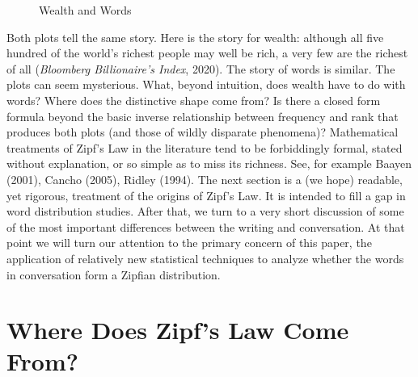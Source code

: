 \documentclass[12pt]{article}
\begin{document}
\begin{figure}[h!]
    \centering
    \hfill
    \caption{Wealth and Words}%
\end{figure}
Both plots tell the same story.  Here is the story for wealth:  although all five hundred of the world's richest people may well be rich, a very few are the richest of all (\emph{Bloomberg Billionaire's Index}, 2020).  The story of words is similar. The plots can seem mysterious. What, beyond intuition, does wealth have to do with words?  Where does the distinctive shape come from? Is there a closed form formula beyond the basic inverse relationship between frequency and rank that produces both plots (and those of wildly disparate phenomena)?  Mathematical treatments of Zipf's Law in the literature tend to be forbiddingly formal, stated without explanation, or so simple as to miss its richness.  See, for example Baayen (2001), Cancho (2005), Ridley (1994).   The next section is a (we hope) readable, yet rigorous, treatment of the origins of Zipf's Law.  It is intended to fill a gap in word distribution studies.  After that, we turn to a very short discussion of some of the most important differences between the writing and conversation.  At that point we will turn our attention to the primary concern of this paper, the application of relatively new statistical techniques to analyze whether the words in conversation form a Zipfian distribution.


\section{Where Does Zipf's Law Come From?}
\end{document}
